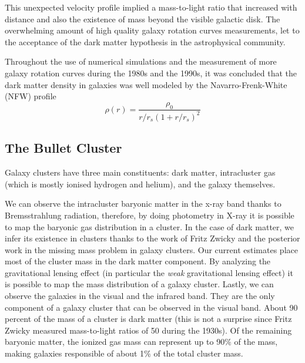 This unexpected velocity profile implied a mass-to-light ratio that increased with distance and also the existence of mass beyond the visible galactic disk\cite{theIsMassOutside}.
The overwhelming amount of high quality galaxy rotation curves measurements, let to the acceptance of the dark matter hypothesis in the astrophysical community.

Throughout the use of numerical simulations and the measurement of more galaxy rotation curves during the 1980s and the 1990s, it was concluded that the dark matter density in galaxies was well modeled by the Navarro-Frenk-White (NFW) profile\cite{FWN}\cite{mariangela}
\begin{equation}
\rho(r) = \frac{\rho_0}{r/r_s(1+r/r_s)^2}
\end{equation}
\subsection{The Bullet Cluster}
Galaxy clusters have three main constituents: dark matter, intracluster gas (which is mostly ionised hydrogen and helium), and the galaxy themselves.\cite{book:75345}

We can observe the intracluster baryonic matter in the x-ray band thanks to Bremsstrahlung radiation, therefore, by doing photometry in X-ray it is possible to map the baryonic gas distribution in a cluster.
In the case of dark matter, we infer its existence in clusters thanks to the work of Fritz Zwicky and the posterior work in the missing mass problem in galaxy clusters.
Our current estimates place most of the cluster mass in the dark matter component.
By analyzing the gravitational lensing effect (in particular the \emph{weak} gravitational lensing effect) it is possible to map the mass distribution of a galaxy cluster. 
Lastly, we can observe the galaxies in the visual and the infrared band.
They are the only component of a galaxy cluster that can be observed in the visual band.
About 90 percent of the mass of a cluster is dark matter (this is not a surprise since Fritz Zwicky measured mass-to-light ratios of 50 during the 1930s). Of the remaining baryonic matter, the ionized gas mass can represent up to 90$\%$ of the mass, making galaxies responsible of about 1$\%$ of the total cluster mass.

